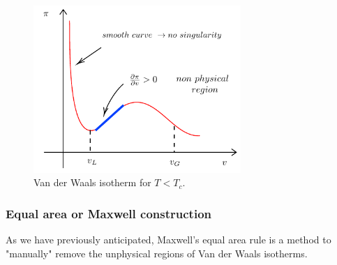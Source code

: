 \documentclass[../main/main.tex]{subfiles}
\begin{document}
\begin{figure}[h!]
\centering
\includegraphics[width=0.7\textwidth]{../lessons/14_image/4.pdf}
\caption{\label{fig:14_3} Van der Waals isotherm for \(T<T_c\).}
\end{figure}


\subsubsection{Equal area or Maxwell construction}
As we have previously anticipated, Maxwell's equal area rule is a method to "manually" remove the unphysical regions of Van der Waals isotherms.
\end{document}
